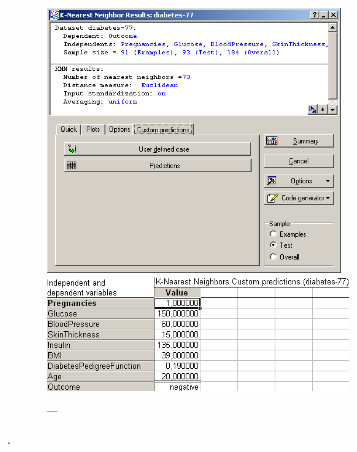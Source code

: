 \begin{figure}[!h]
  \centering

  \begin{minipage}{0.49\textwidth}
    \centering

    \includegraphics[height=7cm]
    {inc/v5_30.PNG}

    \caption{\_}

    \label{fig:23}
  \end{minipage}
  \begin{minipage}{0.49\textwidth}
    \centering

    \includegraphics[width=8cm]
    {inc/v5_31.PNG}

    \caption{\_}

    \label{fig:24}
  \end{minipage}
\end{figure}

\newpage

.
